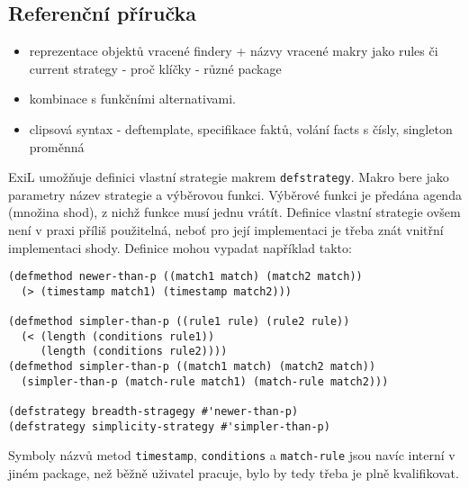 \subsection{Referenční příručka}
\begin{framed}
  \begin{itemize}
    \item reprezentace objektů vracené findery + názvy vracené makry jako rules či current
strategy - proč klíčky - různé package
    \item kombinace s funkčními alternativami.
    \item clipsová syntax - deftemplate, specifikace faktů, volání facts s
      čísly, singleton proměnná
  \end{itemize}
\end{framed}

ExiL umožňuje definici vlastní strategie makrem \verb|defstrategy|. Makro bere
jako parametry název strategie a výběrovou funkci. Výběrové funkci je předána
agenda (množina shod), z nichž funkce musí jednu vrátít. Definice vlastní
strategie ovšem není v praxi příliš použitelná, neboť pro její implementaci je
třeba znát vnitřní implementaci shody. Definice mohou vypadat například takto:
\begin{verbatim}
(defmethod newer-than-p ((match1 match) (match2 match))
  (> (timestamp match1) (timestamp match2)))

(defmethod simpler-than-p ((rule1 rule) (rule2 rule))
  (< (length (conditions rule1))
     (length (conditions rule2))))
(defmethod simpler-than-p ((match1 match) (match2 match))
  (simpler-than-p (match-rule match1) (match-rule match2)))

(defstrategy breadth-stragegy #'newer-than-p)
(defstrategy simplicity-strategy #'simpler-than-p)
\end{verbatim}
Symboly názvů metod \verb|timestamp|, \verb|conditions| a \verb|match-rule| jsou
navíc interní v jiném package, než běžně uživatel pracuje, bylo by tedy třeba je
plně kvalifikovat.
